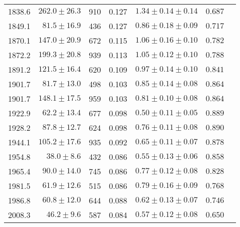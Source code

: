 \begin{tabular}{r r r r r r r}
  1838.6 & $ 262.0 \pm  26.3$ &   910 & 0.127 & $  1.34 \pm 0.14 \pm 0.14$ & $  0.687$ \\
  1849.1 & $  81.5 \pm  16.9$ &   436 & 0.127 & $  0.86 \pm 0.18 \pm 0.09$ & $  0.717$ \\
  1870.1 & $ 147.0 \pm  20.9$ &   672 & 0.115 & $  1.06 \pm 0.16 \pm 0.10$ & $  0.782$ \\
  1872.2 & $ 199.3 \pm  20.8$ &   939 & 0.113 & $  1.05 \pm 0.12 \pm 0.10$ & $  0.788$ \\
  1891.2 & $ 121.5 \pm  16.4$ &   620 & 0.109 & $  0.97 \pm 0.14 \pm 0.10$ & $  0.841$ \\
  1901.7 & $  81.7 \pm  13.0$ &   498 & 0.103 & $  0.85 \pm 0.14 \pm 0.08$ & $  0.864$ \\
  1901.7 & $ 148.1 \pm  17.5$ &   959 & 0.103 & $  0.81 \pm 0.10 \pm 0.08$ & $  0.864$ \\
  1922.9 & $  62.2 \pm  13.4$ &   677 & 0.098 & $  0.50 \pm 0.11 \pm 0.05$ & $  0.889$ \\
  1928.2 & $  87.8 \pm  12.7$ &   624 & 0.098 & $  0.76 \pm 0.11 \pm 0.08$ & $  0.890$ \\
  1944.1 & $ 105.2 \pm  17.6$ &   935 & 0.092 & $  0.65 \pm 0.11 \pm 0.07$ & $  0.878$ \\
  1954.8 & $  38.0 \pm   8.6$ &   432 & 0.086 & $  0.55 \pm 0.13 \pm 0.06$ & $  0.858$ \\
  1965.4 & $  90.0 \pm  14.0$ &   745 & 0.086 & $  0.77 \pm 0.12 \pm 0.08$ & $  0.828$ \\
  1981.5 & $  61.9 \pm  12.6$ &   515 & 0.086 & $  0.79 \pm 0.16 \pm 0.09$ & $  0.768$ \\
  1986.8 & $  60.8 \pm  12.0$ &   644 & 0.088 & $  0.62 \pm 0.13 \pm 0.07$ & $  0.746$ \\
  2008.3 & $  46.2 \pm   9.6$ &   587 & 0.084 & $  0.57 \pm 0.12 \pm 0.08$ & $  0.650$ \\
\end{tabular}
